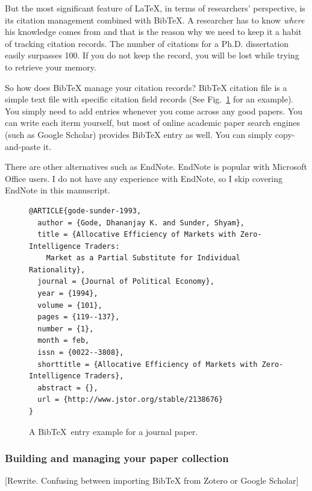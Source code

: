 \documentclass[11pt]{article}
\begin{document}
But the most significant feature of \LaTeX, in terms of researchers'
perspective, is its citation management combined with BibTeX. A researcher has
to know \emph{where} his knowledge comes from and that is the reason why we
need to keep it a habit of tracking citation records.  The number of citations
for a Ph.D. dissertation easily surpasses 100.  If you do not keep the record,
you will be lost while trying to retrieve your memory.

So how does BibTeX manage your citation records? BibTeX citation file is a
simple text file with specific citation field records (See
Fig.~\ref{fig:bibtex-example} for an example). You simply need to add entries
whenever you come across any good papers. You can write each iterm yourself,
but most of online academic paper search engines (such as Google Scholar)
provides BibTeX entry as well. You can simply copy-and-paste it.

There are other alternatives such as EndNote. EndNote is popular with
Microsoft Office users. I do not have any experience with EndNote, so I skip
covering EndNote in this manuscript. 

\begin{figure}[ht]
    \begin{center}
    \begin{footnotesize}
\begin{verbatim}
@ARTICLE{gode-sunder-1993,
  author = {Gode, Dhananjay K. and Sunder, Shyam},
  title = {Allocative Efficiency of Markets with Zero-Intelligence Traders:
    Market as a Partial Substitute for Individual Rationality},
  journal = {Journal of Political Economy},
  year = {1994},
  volume = {101},
  pages = {119--137}, 
  number = {1},
  month = feb,
  issn = {0022--3808},
  shorttitle = {Allocative Efficiency of Markets with Zero-Intelligence Traders},
  abstract = {},
  url = {http://www.jstor.org/stable/2138676}
}
\end{verbatim}
    \end{footnotesize}
    \end{center}
    \caption{A BibTeX~entry example for a journal paper.}
    \label{fig:bibtex-example}
\end{figure}


\subsubsection{Building and managing your paper collection}

[Rewrite. Confusing between importing BibTeX from Zotero or Google Scholar]
\end{document}
